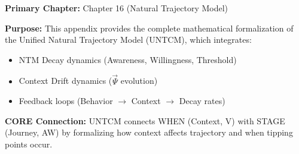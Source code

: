 \begin{tcolorbox}[colback=green!5!white,colframe=green!75!black,title=Chapter Linkage]
\textbf{Primary Chapter:} Chapter 16 (Natural Trajectory Model)

\textbf{Purpose:} This appendix provides the complete mathematical formalization of the Unified Natural Trajectory Model (UNTCM), which integrates:
\begin{itemize}[nosep]
    \item NTM Decay dynamics (Awareness, Willingness, Threshold)
    \item Context Drift dynamics ($\vec{\Psi}$ evolution)
    \item Feedback loops (Behavior $\rightarrow$ Context $\rightarrow$ Decay rates)
\end{itemize}

\textbf{CORE Connection:} UNTCM connects WHEN (Context, V) with STAGE (Journey, AW) by formalizing how context affects trajectory and when tipping points occur.
\end{tcolorbox}

\begin{abstract}
The Unified Natural Trajectory Model (UNTCM) formalizes the coupled dynamics of individual behavior change (Awareness $A$, Willingness $W$, Threshold $\theta$) and contextual evolution (social norms $\Psi_S$, technology $\Psi_T$, economic conditions $\Psi_E$, institutions $\Psi_I$, culture $\Psi_C$). The model captures three qualitative regimes: (I) Decay-Dominant where behavior naturally declines, (II) Feedback-Dominant where behavior becomes self-sustaining via positive feedback (lock-in), and (III) Oscillatory where boom-bust cycles emerge. The critical tipping point $\bar{B}^* \approx 10-25\%$ determines when interventions can trigger regime transitions. UNTCM provides a unified framework for intervention timing, portfolio design, and long-term outcome prediction.
\end{abstract}

